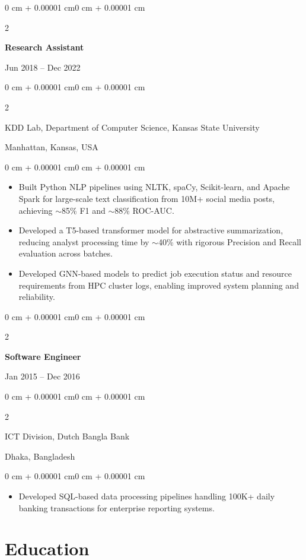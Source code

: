 \documentclass[10pt, letterpaper]{article}
\newenvironment{highlights}{
    \begin{itemize}[topsep=0.10 cm, parsep=0.10 cm, partopsep=0pt, itemsep=0pt, leftmargin=0 cm + 10pt]
}{\end{itemize}}
\newenvironment{onecolentry}{
    \begin{adjustwidth}{0 cm + 0.00001 cm}{0 cm + 0.00001 cm}
}{\end{adjustwidth}}
\newenvironment{twocolentry}[2][]{
    \onecolentry
    \def\secondColumn{#2}
    \setcolumnwidth{\fill, 4.5 cm}
    \begin{paracol}{2}
}{
    \switchcolumn \raggedleft \secondColumn
    \end{paracol}
    \endonecolentry
}
\begin{document}
    \vspace{1mm}

    \begin{twocolentry}{Jun 2018 -- Dec 2022}
        \textbf{Research Assistant}
    \end{twocolentry}
    \begin{twocolentry}{Manhattan, Kansas, USA}
       KDD Lab, Department of Computer Science, Kansas State University
    \end{twocolentry}
    \vspace{0.10 cm}
    \begin{onecolentry}
        \begin{highlights}
            \item Built Python NLP pipelines using NLTK, spaCy, Scikit-learn, and Apache Spark for large-scale text classification from 10M+ social media posts, achieving $\sim$85\% F1 and $\sim$88\% ROC-AUC.
            \item Developed a T5-based transformer model for abstractive summarization, reducing analyst processing time by $\sim$40\% with rigorous Precision and Recall evaluation across batches.
            \item Developed GNN-based models to predict job execution status and resource requirements from HPC cluster logs, enabling improved system planning and reliability.
        \end{highlights}
    \end{onecolentry}

    \vspace{0.1 cm}
    \begin{twocolentry}{Jan 2015 -- Dec 2016}
        \textbf{Software Engineer}
    \end{twocolentry}
    \begin{twocolentry}{Dhaka, Bangladesh}
       ICT Division, Dutch Bangla Bank
    \end{twocolentry}

    \begin{onecolentry}
        \begin{highlights}
            \item Developed SQL-based data processing pipelines handling 100K+ daily banking transactions for enterprise reporting systems.
        \end{highlights}
    \end{onecolentry}

\section{Education}
\end{document}
